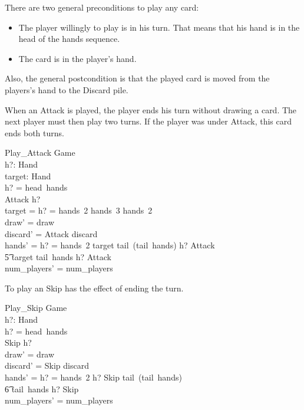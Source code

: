 \documentclass[11pt, fuzz]{article}
\begin{document}
There are two general preconditions to play any card:

\begin{itemize}
    \item The player willingly to play is in his turn. That means that his hand is in the head of the hands sequence. 
    \item The card is in the player's hand. 
\end{itemize}

Also, the general postcondition is that the played card is moved from the players's hand to the Discard pile. 

When an Attack is played, the player ends his turn without drawing a card. The next player must then play two turns. If the player was under Attack, this card ends both turns.  

\begin{schema}{Play\_Attack}
    \Delta Game \\
    h?: Hand \\
    target: Hand \\
\where
    h? = head~hands \\
    Attack \inbag h? \\
    target = \IF h? = hands~2 \THEN hands~3 \ELSE hands~2\\
    draw' = draw \\
    discard' = \langle Attack \rangle \cat discard \\
    hands' = \IF h? = hands~2 \THEN \langle target \rangle \cat tail~(tail~hands) \cat \langle h? \uminus \lbag Attack \rbag \rangle \\ \t5 \ELSE \langle target \rangle \cat tail~hands \cat \langle h? \uminus \lbag Attack \rbag \rangle  \\
    num\_players' = num\_players
\end{schema}

To play an Skip has the effect of ending the turn. 

\begin{schema}{Play\_Skip}
    \Delta Game \\
    h?: Hand \\
\where
    h? = head~hands \\
    Skip \inbag h? \\
    draw' = draw \\ 
    discard' = \langle Skip \rangle \cat discard \\
    hands' = \IF h? = hands~2 \THEN \langle h? \uminus \lbag Skip \rbag \rangle \cat tail~(tail~hands) \\ \t6 \ELSE tail~hands \cat \langle h? \uminus \lbag Skip \rbag \rangle \\
    num\_players' = num\_players
\end{schema}
\end{document}
